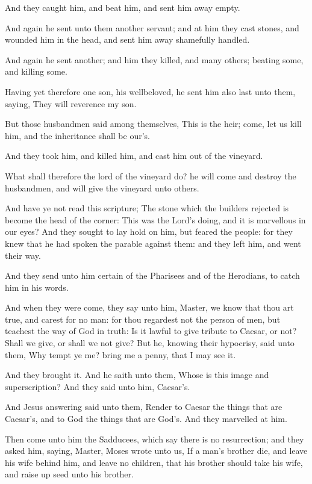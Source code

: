 \Verse And they caught him, and beat him, and sent him away empty.

\Verse And again he sent unto them another servant; and at him they cast stones, and wounded him in the head, and sent him away shamefully handled.

\Verse And again he sent another; and him they killed, and many others; beating some, and killing some.

\Verse Having yet therefore one son, his wellbeloved, he sent him also last unto them, saying, They will reverence my son.

\Verse But those husbandmen said among themselves, This is the heir; come, let us kill him, and the inheritance shall be our's.

\Verse And they took him, and killed him, and cast him out of the vineyard.

\Verse What shall therefore the lord of the vineyard do? he will come and destroy the husbandmen, and will give the vineyard unto others.

\Verse And have ye not read this scripture; The stone which the builders rejected is become the head of the corner: \Verse This was the Lord's doing, and it is marvellous in our eyes?  \Verse And they sought to lay hold on him, but feared the people: for they knew that he had spoken the parable against them: and they left him, and went their way.

\Verse And they send unto him certain of the Pharisees and of the Herodians, to catch him in his words.

\Verse And when they were come, they say unto him, Master, we know that thou art true, and carest for no man: for thou regardest not the person of men, but teachest the way of God in truth: Is it lawful to give tribute to Caesar, or not?  \Verse Shall we give, or shall we not give? But he, knowing their hypocrisy, said unto them, Why tempt ye me? bring me a penny, that I may see it.

\Verse And they brought it. And he saith unto them, Whose is this image and superscription? And they said unto him, Caesar's.

\Verse And Jesus answering said unto them, Render to Caesar the things that are Caesar's, and to God the things that are God's. And they marvelled at him.

\Verse Then come unto him the Sadducees, which say there is no resurrection; and they asked him, saying, \Verse Master, Moses wrote unto us, If a man's brother die, and leave his wife behind him, and leave no children, that his brother should take his wife, and raise up seed unto his brother.


